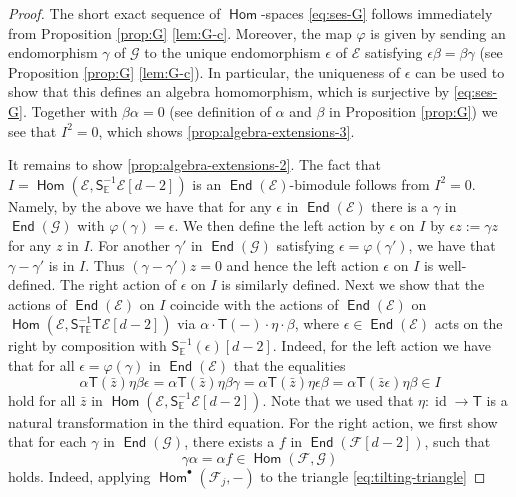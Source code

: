 \documentclass[a4paper,11pt, reqno]{amsart}
\def\E{\mathbb E}
\def\sE{\mathscr{E}}
\def\sF{\mathscr{F}}
\def\sG{\mathscr{G}}
\def\id{{\operatorname{id}}}
\newcommand{\opname}[1]{\operatorname{\mathsf{#1}}}
\newcommand{\Hom}{\opname{Hom}}
\newcommand{\End}{\opname{End}}
\newcommand{\bS}{\mathsf{S}}
\newcommand{\bT}{\mathsf{T}}
\theoremstyle{plain}
\theoremstyle{definition}
\numberwithin{equation}{section}
\begin{document}
\begin{proof}
The short exact sequence of $\Hom$-spaces \eqref{eq:ses-G} follows immediately from Proposition \ref{prop:G} \ref{lem:G-c}. 
Moreover, the map $\varphi$ is given by sending an endomorphism $\gamma$ of $\sG$ to the unique endomorphism $\epsilon$ of $\sE$ satisfying $\epsilon \beta = \beta \gamma$ (see Proposition \ref{prop:G} \ref{lem:G-c}).  
In particular, the uniqueness of $\epsilon$ can be used to show that this defines an algebra homomorphism, which is surjective by \eqref{eq:ses-G}.
Together with $\beta\alpha=0$ (see definition of $\alpha$ and $\beta$ in Proposition \ref{prop:G}) 
we see that $I^2=0$, which shows \eqref{prop:algebra-extensions-3}. 


It remains to show \eqref{prop:algebra-extensions-2}.
The fact that $I = \Hom ( \sE , \bS^{-1}_\E\sE [d-2] )$ is an $\End(\sE)$-bimodule follows from $I^2 = 0$.
Namely, by the above we have that for any $\epsilon$ in $\End ( \sE )$ there is a $\gamma $ in $\End( \sG )$ with $\varphi ( \gamma ) = \epsilon$.
We then define the left action by $\epsilon$ on $I$ by $\epsilon z := \gamma z$ for any $z$ in $I$.
For another $\gamma '$ in $\End ( \sG )$ satisfying $\epsilon =\varphi ( \gamma ' )$, we have that $\gamma - \gamma'$ is in $I$.
Thus $(\gamma - \gamma ' ) z = 0$ and hence the left action $\epsilon$ on $I$ is well-defined.
The right action of $\epsilon$ on $I$ is similarly defined.
Next we show that the actions of $\End(\sE)$ on $I$ coincide with the actions of $\End (\sE)$ on $ \Hom (\sE , \bS^{-1}_{\bT\E}\bT \sE [d-2] )$ via $\alpha \cdot \bT(-) \cdot \eta \cdot \beta$, where
$\epsilon\in \End(\sE)$ acts on the right
by composition with $\bS^{-1}_{\E} (\epsilon ) [d-2]$.
Indeed, for the left action we have that for all $\epsilon = \varphi (\gamma )$ in $\End ( \sE )$ that the equalities 
\[
\alpha \bT ( \bar{z} ) \eta \beta \epsilon = \alpha \bT ( \bar{z} ) \eta \beta  \gamma = \alpha \bT ( \bar{z} ) \eta \epsilon \beta = \alpha \bT ( \bar{z} \epsilon ) \eta  \beta \in I
\]
hold for all $\bar{z}$ in $\Hom ( \sE , \bS^{-1}_\E \sE [d-2] )$.
Note that we used that $\eta \colon \id \to \bT $ is a natural transformation in the third equation.
For the right action, we  
first show that for each $\gamma$ in $\End ( \sG )$, 
there exists a $f$ in $\End (\sF [d-2] )$, such that 
\begin{equation}\label{eq:alpha-f}
    \gamma \alpha = \alpha f \in \Hom (\sF , \sG )
\end{equation}
holds. 
Indeed, applying $\Hom^\bullet (\sF_j , -)$ to the triangle \eqref{eq:tilting-triangle}

\end{proof}
\end{document}
